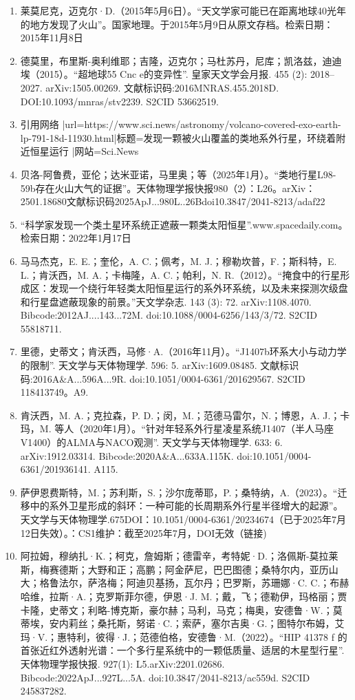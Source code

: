 \begin{enumerate}
\item 莱莫尼克，迈克尔·D.（2015年5月6日）。“天文学家可能已在距离地球40光年的地方发现了火山”。国家地理。于2015年5月9日从原文存档。检索日期：2015年11月8日
\item 德莫里，布里斯-奥利维耶；吉隆，迈克尔；马杜苏丹，尼库；凯洛兹，迪迪埃（2015）。“超地球55 Cnc e的变异性”. 皇家天文学会月报. 455 (2): 2018–2027. arXiv:1505.00269. 文献标识码:2016MNRAS.455.2018D. DOI:10.1093/mnras/stv2239. S2CID 53662519.
\item {{引用网络 |url=https://www.sci.news/astronomy/volcano-covered-exo-earth-lp-791-18d-11930.html|标题=发现一颗被火山覆盖的类地系外行星，环绕着附近恒星运行 |网站=Sci.News}}
\item 贝洛-阿鲁费，亚伦；达米亚诺，马里奥；等（2025年1月）。“类地行星L98-59b存在火山大气的证据”。天体物理学报快报980（2）：L26。arXiv：2501.18680文献标识码2025ApJ...980L..26Bdoi10.3847/2041-8213/adaf22
\item “科学家发现一个类土星环系统正遮蔽一颗类太阳恒星”.www.spacedaily.com。检索日期：2022年1月17日
\item 马马杰克，E. E.；奎伦，A. C.；佩考，M. J.；穆勒坎普，F.；斯科特，E. L.；肯沃西，M. A.；卡梅隆，A. C.；帕利，N. R.（2012）。“掩食中的行星形成区：发现一个绕行年轻类太阳恒星运行的系外环系统，以及未来探测次级盘和行星盘遮蔽现象的前景。”天文学杂志. 143 (3): 72. arXiv:1108.4070. Bibcode:2012AJ....143...72M. doi:10.1088/0004-6256/143/3/72. S2CID 55818711.
\item 里德，史蒂文；肯沃西，马修·A.（2016年11月）。“J1407b环系大小与动力学的限制”. 天文学与天体物理学. 596: 5. arXiv:1609.08485. 文献标识码:2016A&A...596A...9R. doi:10.1051/0004-6361/201629567. S2CID 118413749。A9.
\item 肯沃西，M. A.；克拉森，P. D.；闵，M.；范德马雷尔，N.；博恩，A. J.；卡玛，M. 等人（2020年1月）。“针对年轻系外行星凌星系统J1407（半人马座V1400）的ALMA与NACO观测”. 天文学与天体物理学. 633: 6. arXiv:1912.03314. Bibcode:2020A&A...633A.115K. doi:10.1051/0004-6361/201936141. A115.
\item 萨伊恩费斯特，M.；苏利斯，S.；沙尔庞蒂耶，P.；桑特纳，A.（2023）。“迁移中的系外卫星形成的斜环：一种可能的长周期系外行星半径增大的起源”。天文学与天体物理学.675DOI：10.1051/0004-6361/20234674（已于2025年7月12日失效）。：CS1维护：截至2025年7月，DOI无效（链接)
\item 阿拉姆，穆纳扎·K.；柯克，詹姆斯；德雷辛，考特妮·D.；洛佩斯-莫拉莱斯，梅赛德斯；大野和正；高鹏；阿金萨尼，巴巴图德；桑特尔内，亚历山大；格鲁法尔，萨洛梅；阿迪贝基扬，瓦尔丹；巴罗斯，苏珊娜·C. C.；布赫哈维，拉斯·A.；克罗斯菲尔德，伊恩·J. M.；戴，飞；德勒伊，玛格丽；贾卡隆，史蒂文；利略-博克斯，豪尔赫；马利，马克；梅奥，安德鲁·W.；莫蒂埃，安内莉丝；桑托斯，努诺·C.；索萨，塞尔吉奥·G.；图特尔布姆，艾玛·V.；惠特利，彼得·J.；范德伯格，安德鲁·M.（2022）。“HIP 41378 f 的首张近红外透射光谱：一个多行星系统中的一颗低质量、适居的木星型行星”. 天体物理学报快报. 927(1): L5.arXiv:2201.02686. Bibcode:2022ApJ...927L...5A. doi:10.3847/2041-8213/ac559d. S2CID 245837282.

\end{enumerate}
